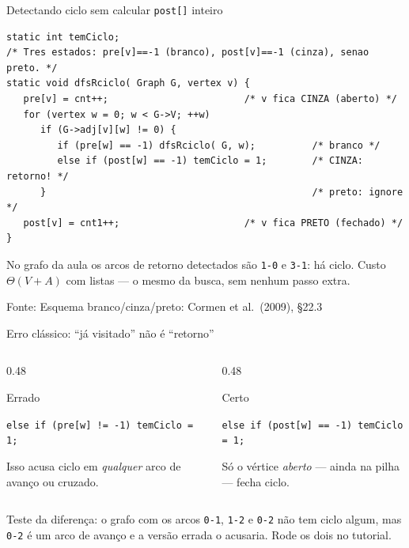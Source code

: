 \documentclass[aspectratio=169]{beamer}
\newcommand{\fonte}[1]{\vfill{\tiny\color{gray!60!black}Fonte: #1\par}}
\begin{document}
\begin{frame}[fragile]{Detectando ciclo sem calcular \texttt{post[]} inteiro}
\begin{lstlisting}
static int temCiclo;
/* Tres estados: pre[v]==-1 (branco), post[v]==-1 (cinza), senao preto. */
static void dfsRciclo( Graph G, vertex v) {
   pre[v] = cnt++;                        /* v fica CINZA (aberto) */
   for (vertex w = 0; w < G->V; ++w)
      if (G->adj[v][w] != 0) {
         if (pre[w] == -1) dfsRciclo( G, w);          /* branco */
         else if (post[w] == -1) temCiclo = 1;        /* CINZA: retorno! */
      }                                               /* preto: ignore  */
   post[v] = cnt1++;                      /* v fica PRETO (fechado) */
}
\end{lstlisting}
  {\scriptsize No grafo da aula os arcos de retorno detectados são
  \texttt{1-0} e \texttt{3-1}: há ciclo. Custo $\Theta(V+A)$ com listas --- o
  mesmo da busca, sem nenhum passo extra.}
  \fonte{Esquema branco/cinza/preto: Cormen et al.\ (2009), \S 22.3~\cite{cormen2009introduction}}
\end{frame}

\begin{frame}{Erro clássico: ``já visitado'' não é ``retorno''}
  \begin{columns}[T]
    \begin{column}{0.48\textwidth}
      \begin{block}{Errado}
        {\scriptsize \texttt{else if (pre[w] != -1) temCiclo = 1;}

        \medskip
        Isso acusa ciclo em \emph{qualquer} arco de avanço ou cruzado.}
      \end{block}
    \end{column}
    \begin{column}{0.48\textwidth}
      \begin{exampleblock}{Certo}
        {\scriptsize \texttt{else if (post[w] == -1) temCiclo = 1;}

        \medskip
        Só o vértice \emph{aberto} --- ainda na pilha --- fecha ciclo.}
      \end{exampleblock}
    \end{column}
  \end{columns}
  \medskip
  {\small Teste da diferença: o grafo com os arcos \texttt{0-1}, \texttt{1-2} e
  \texttt{0-2} não tem ciclo algum, mas \texttt{0-2} é um arco de avanço e a
  versão errada o acusaria. Rode os dois no tutorial.}
\end{frame}
\end{document}
